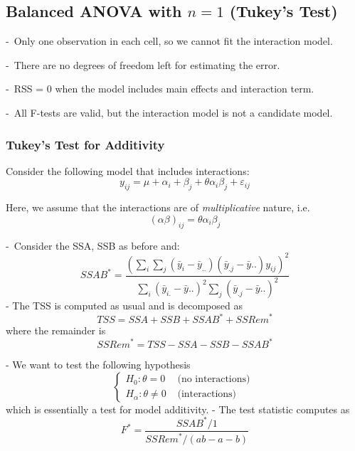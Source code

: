 \documentclass[11pt,a4paper]{article}
\begin{document}
\subsection{ Balanced ANOVA with $n = 1$ (Tukey’s Test)}
-\ Only one observation in each cell, so we cannot ﬁt the interaction model.

-\ There are no degrees of freedom left for estimating the error.

-\ RSS = 0 when the model includes main eﬀects and interaction term.

-\ All F-tests are valid, but the interaction model is not a candidate model.

\subsubsection{ Tukey’s Test for Additivity}
Consider the following model that includes interactions:
$$y_{ij}=\mu+\alpha_i+\beta_j+\theta\alpha_i\beta_j+\varepsilon_{ij}$$

Here, we assume that the interactions are of \textit{multiplicative} nature, i.e.
$$(\alpha\beta)_{ij}=\theta\alpha_i\beta_j$$

-\ Consider the SSA, SSB as before and:
$$
{S S A B}^{*}=\frac{\left(\sum_{i} \sum_{j}\left(\bar{y}_{i}-\bar{y}_{. .}\right)\left(\bar{y}_{. j}-\bar{y} . .\right) y_{i j}\right)^{2}}{\sum_{i}\left(\bar{y}_{i .}-\bar{y} . .\right)^{2} \sum_{j}\left(\bar{y}_{. j}-\bar{y} . .\right)^{2}}
$$
- The TSS is computed as usual and is decomposed as
$$
T S S=S S A+S S B+{S S A B}^{*}+{S S R e m}^{*}
$$
where the remainder is
$$
{S S R e m}^{*}=T S S-S S A-S S B-S S A B^{*}
$$

- We want to test the following hypothesis
$$
\begin{cases}H_{0}: \theta=0 & \text { (no interactions) } \\ H_{\alpha}: \theta \neq 0 & \text { (interactions) }\end{cases}
$$
which is essentially a test for model additivity.
- The test statistic computes as
$$
F^{*}=\frac{{S S A B}^{*} / 1}{{S S R e m}^{*} /(a b-a-b)}
$$
\end{document}

